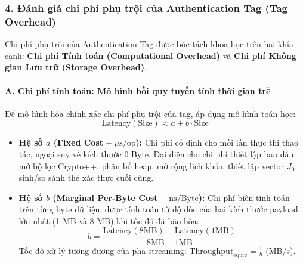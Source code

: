 \documentclass[12pt, a4paper]{report}
\begin{document}
\subsubsection{4. Đánh giá chi phí phụ trội của Authentication Tag (Tag Overhead)}

Chi phí phụ trội của Authentication Tag được bóc tách khoa học trên hai khía cạnh: \textbf{Chi phí Tính toán (Computational Overhead)} và \textbf{Chi phí Không gian Lưu trữ (Storage Overhead)}.

\paragraph{A. Chi phí tính toán: Mô hình hồi quy tuyến tính thời gian trễ}
Để mô hình hóa chính xác chi phí phụ trội của tag, áp dụng mô hình toán học:
\[ \text{Latency}(\text{Size}) \approx a + b \cdot \text{Size} \]
\begin{itemize}
    \item \textbf{Hệ số $a$ (Fixed Cost -- $\mu\text{s/op}$):} Chi phí cố định cho mỗi lần thực thi thao tác, ngoại suy về kích thước 0 Byte. Đại diện cho chi phí thiết lập ban đầu: mở bộ lọc Crypto++, phân bổ heap, mở rộng lịch khóa, thiết lập vector $J_0$, sinh/so sánh thẻ xác thực cuối cùng.
    \item \textbf{Hệ số $b$ (Marginal Per-Byte Cost -- $\text{ns/Byte}$):} Chi phí biên tính toán trên từng byte dữ liệu, được tính toán từ độ dốc của hai kích thước payload lớn nhất (1 MB và 8 MB) khi tốc độ đã bão hòa:
    \[ b = \frac{\text{Latency}(8\text{MB}) - \text{Latency}(1\text{MB})}{8\text{MB} - 1\text{MB}} \]
    Tốc độ xử lý tương đương của pha streaming: $\text{Throughput}_{\text{equiv}} = \frac{1}{b}$ (MB/s).
\end{itemize}
\end{document}
